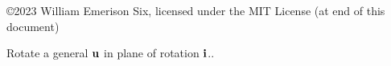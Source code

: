 \documentclass[12pt]{article}
\newenvironment{problem}[2][Problem]{\begin{trivlist}
\item[\hskip \labelsep {\bfseries #1}\hskip \labelsep {\bfseries #2.}]}{\end{trivlist}}
\begin{document}

\rhead{\today}


\copyright 2023 William Emerison Six, licensed under the MIT License (at end of this document)

\begin{problem}{5.5.6} %

  Rotate a general $\vb{u}$ in plane of rotation $\vb{i}$..
\end{problem}
\end{document}

